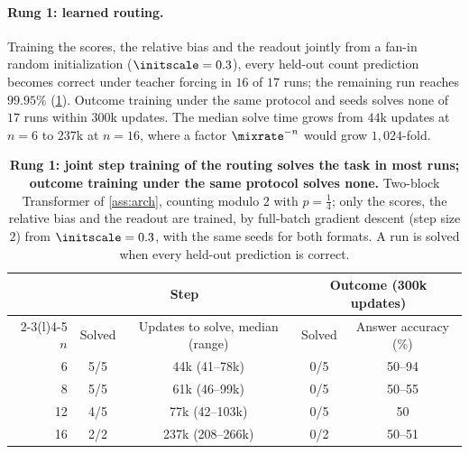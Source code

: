 \paragraph{Rung 1: learned routing.} Training the scores, the relative bias and the readout jointly from a fan-in random initialization
($\initscale=0.3$), every held-out count prediction becomes correct under teacher forcing in $16$ of $17$ runs; the remaining run reaches $99.95\%$
(\cref{tab:reach}). Outcome training under the same protocol and seeds solves none of $17$ runs within $300$k updates. The median solve
time grows from $44$k updates at $n=6$ to $237$k at $n=16$, where a factor $\mixrate^{-n}$ would grow $1{,}024$-fold.

\begin{table}[t]
\caption{\textbf{Rung 1: joint step training of the routing solves the task in most runs; outcome training under the same protocol solves
none.} Two-block Transformer of \cref{ass:arch}, counting modulo $2$ with $p=\tfrac{1}{4}$; only the scores, the relative bias and the
readout are trained, by full-batch gradient descent (step size $2$) from $\initscale=0.3$, with the same seeds for both formats. A run is
solved when every held-out prediction is correct.}
\label{tab:reach}
\centering\small
\begin{tabular}{@{}rcccc@{}}
\toprule
 & \multicolumn{2}{c}{Step} & \multicolumn{2}{c}{Outcome (300k updates)}\\
\cmidrule(lr){2-3}\cmidrule(l){4-5}
$n$ & Solved & Updates to solve, median (range) & Solved & Answer accuracy (\%)\\
\midrule
6  & 5/5 & 44k (41--78k)   & 0/5 & 50--94\\
8  & 5/5 & 61k (46--99k)   & 0/5 & 50--55\\
12 & 4/5 & 77k (42--103k)  & 0/5 & 50\\
16 & 2/2 & 237k (208--266k) & 0/2 & 50--51\\
\bottomrule
\end{tabular}
\end{table}

